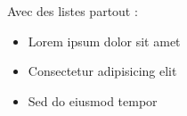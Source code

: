 Avec des listes partout :

\begin{itemize}
\item Lorem ipsum dolor sit amet
\item Consectetur adipisicing elit
\item Sed do eiusmod tempor
\end{itemize}


